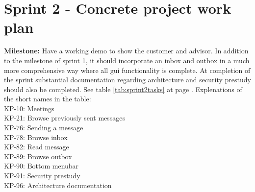 \section{Sprint 2 - Concrete project work plan}

\textbf{Milestone:} Have a working demo to show the customer and advisor. In addition to the milestone of sprint 1, it should incorporate an inbox and outbox in a much more comprehensive way where all \gls{gui} functionality is complete. At completion of the sprint substantial documentation regarding architecture and security prestudy should also be completed.
\newline
\newline
See table \ref{tab:sprint2tasks} at page \pageref{tab:sprint2tasks}.
\newline
\newline
Explenations of the short names in the table:\\
KP-10: Meetings\\
KP-21: Browse previously sent messages\\
KP-76: Sending a message\\
KP-78: Browse inbox\\
KP-82: Read message\\
KP-89: Browse outbox\\
KP-90: Bottom menubar\\
KP-91: Security prestudy\\
KP-96: Architecture documentation\\

